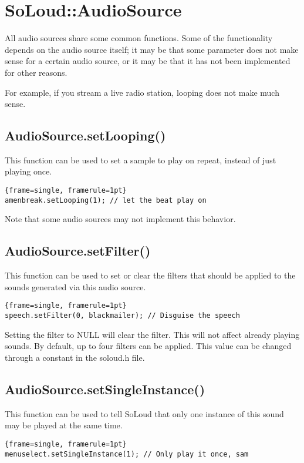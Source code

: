 
\chapter{SoLoud::AudioSource}

All audio sources share some common functions. Some of the functionality depends on the audio source itself; it may be that some parameter does not make sense for a certain audio source, or it may be that it has not been implemented for other reasons.

For example, if you stream a live radio station, looping does not make much sense.

\section{AudioSource.setLooping()}

This function can be used to set a sample to play on repeat, instead of just playing once.

\begin{lstlisting}{frame=single, framerule=1pt}
amenbreak.setLooping(1); // let the beat play on
\end{lstlisting}

Note that some audio sources may not implement this behavior.

\section{AudioSource.setFilter()}

This function can be used to set or clear the filters that should be applied to the sounds generated via this audio source.

\begin{lstlisting}{frame=single, framerule=1pt}
speech.setFilter(0, blackmailer); // Disguise the speech
\end{lstlisting}

Setting the filter to NULL will clear the filter. This will not affect already playing sounds.
By default, up to four filters can be applied. This value can be changed through a constant in the soloud.h file.

\section{AudioSource.setSingleInstance()}

This function can be used to tell SoLoud that only one instance of this sound may be played at the same time.

\begin{lstlisting}{frame=single, framerule=1pt}
menuselect.setSingleInstance(1); // Only play it once, sam
\end{lstlisting}
